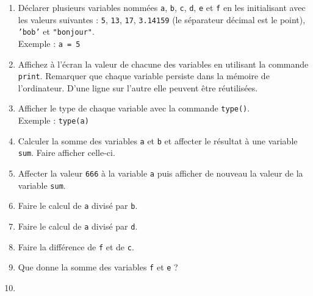 \begin{enumerate}


\item        Déclarer        plusieurs        variables        nommées
  \texttt{a}, \texttt{b}, \texttt{c}, \texttt{d},      \texttt{e}      et
  \texttt{f} en les initialisant avec les valeurs suivantes : \texttt{5}, \texttt{13},
  \texttt{17}, \texttt{3.14159} (le séparateur décimal est le point),
  \texttt{'bob'} et \texttt{"bonjour"}.\\ Exemple : \texttt{a = 5}



\item  Affichez  à l'écran  la  valeur  de  chacune des  variables  en
  utilisant la commande \texttt{print}. Remarquer que chaque variable
  persiste dans la mémoire de l'ordinateur. D'une ligne sur l'autre
  elle peuvent être réutilisées. 

\item  Afficher   le  type  de   chaque  variable  avec   la  commande
  \texttt{type()}.\\ Exemple : \texttt{type(a)}

\item Calculer la somme des variables \texttt{a} et \texttt{b} et affecter
  le  résultat  à  une   variable  \texttt{sum}. Faire afficher celle-ci.

\item Affecter la valeur \texttt{666} à la variable \texttt{a} puis afficher de
  nouveau la valeur de la variable \texttt{sum}.

\item  Faire  le calcul  de  \texttt{a}  divisé par  \texttt{b}.

\item  Faire  le calcul  de  \texttt{a}  divisé par  \texttt{d}.

\item  Faire  la  différence  de \texttt{f}  et  de  \texttt{c}.

\item Que donne la somme des variables \texttt{f} et \texttt{e} ?

\item 

\end{enumerate}

